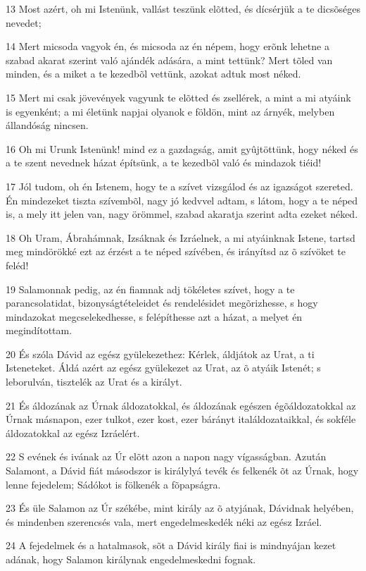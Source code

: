 \par 13 Most azért, oh mi Istenünk, vallást teszünk elõtted, és dícsérjük a te dicsõséges nevedet;
\par 14 Mert micsoda vagyok én, és micsoda az én népem, hogy erõnk lehetne a szabad akarat szerint való ajándék adására, a mint tettünk? Mert tõled van minden, és a miket a te kezedbõl vettünk, azokat adtuk most néked.
\par 15 Mert mi csak jövevények vagyunk te elõtted és zsellérek, a mint a mi atyáink is egyenként; a mi életünk napjai olyanok e földön, mint az árnyék, melyben  állandóság nincsen.
\par 16 Oh mi Urunk Istenünk! mind ez a gazdagság, amit gyûjtöttünk, hogy néked és a te szent nevednek házat építsünk, a te kezedbõl való és mindazok tiéid!
\par 17 Jól tudom, oh én Istenem, hogy te a szívet vizsgálod és az igazságot szereted. Én mindezeket tiszta szívembõl, nagy jó kedvvel adtam, s látom, hogy a te néped is, a mely itt jelen van, nagy örömmel, szabad akaratja szerint adta ezeket néked.
\par 18 Oh Uram, Ábrahámnak, Izsáknak és Izráelnek, a mi atyáinknak Istene, tartsd meg mindörökké ezt az  érzést a te néped szívében, és irányítsd az õ szívöket te feléd!
\par 19 Salamonnak pedig, az én fiamnak adj tökéletes szívet, hogy a te parancsolatidat, bizonyságtételeidet és rendelésidet megõrizhesse, s hogy mindazokat megcselekedhesse, s felépíthesse azt a házat, a melyet én megindítottam.
\par 20 És szóla Dávid az egész gyülekezethez: Kérlek, áldjátok az Urat, a ti Isteneteket. Áldá azért az egész gyülekezet az Urat, az õ atyáik Istenét; s leborulván, tisztelék az Urat és a királyt.
\par 21 És áldozának az Úrnak áldozatokkal, és áldozának egészen égõáldozatokkal az Úrnak másnapon, ezer tulkot, ezer kost, ezer bárányt italáldozataikkal, és sokféle áldozatokkal az egész Izráelért.
\par 22 S evének és ivának az Úr elõtt azon a napon nagy vígasságban. Azután Salamont, a Dávid fiát másodszor is királylyá tevék és felkenék õt az Úrnak, hogy lenne fejedelem; Sádókot is fölkenék a fõpapságra.
\par 23 És üle Salamon az Úr székébe, mint király az õ atyjának, Dávidnak helyében, és mindenben szerencsés vala, mert engedelmeskedék néki az egész Izráel.
\par 24 A fejedelmek és a hatalmasok, sõt a Dávid király fiai is mindnyájan kezet adának, hogy Salamon királynak engedelmeskedni fognak.
